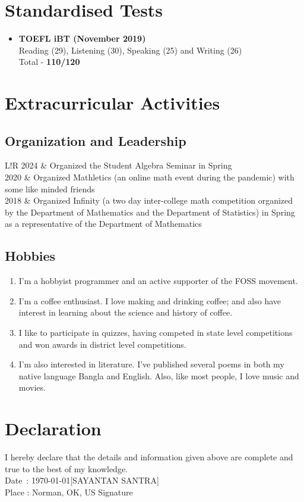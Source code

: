 \documentclass{article}
\newcommand\VRule{\color{lightgray}\vrule width 0.5pt}
\begin{document}
\section{Standardised Tests}
\begin{itemize}
	\item {\bf TOEFL iBT (November 2019)} \\
	      Reading (29), Listening (30), Speaking (25) and Writing (26) \\
	      Total - {\bf 110/120}
\end{itemize}

\section{Extracurricular Activities}
\subsection{Organization and Leadership}
\begin{tabular}{L!{\VRule}R}
	2024 & Organized the Student Algebra Seminar in Spring                                                                               \\
	2020 & Organized Mathletics (an online math event during the pandemic) with some like minded friends                                 \\
	2018 & Organized Infinity (a two day inter-college math competition organized by the Department of Mathematics and the Department of
	Statistics) in Spring as a representative of the Department of Mathematics
\end{tabular}
\subsection{Hobbies}
\begin{enumerate}[label=(\alph*)]
	\item I'm a hobbyist programmer and an active supporter of the FOSS movement.
	\item I'm a coffee enthusiast. I love making and drinking coffee; and also have interest in learning about the science and history of
	      coffee.
	\item I like to participate in quizzes, having competed in state level competitions and won awards in district level competitions.
	\item I'm also interested in literature. I've published several poems in both my native language Bangla and English. Also, like most
	      people, I love music and movies.
\end{enumerate}

\section{Declaration}
I hereby declare that the details and information given above are complete and true to the best of my knowledge.
\vspace*{2cm} \\
Date \,: \today \hfill [SAYANTAN SANTRA] \\
Place  : Norman, OK, US \hfill Signature \hspace{1cm}
\end{document}
